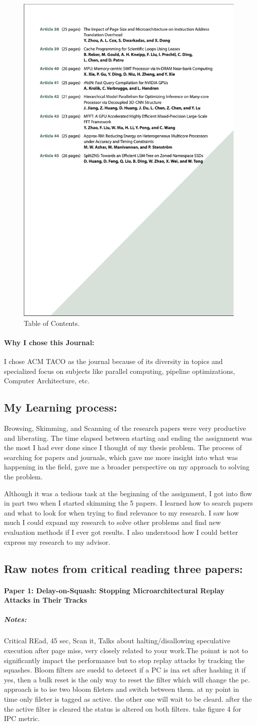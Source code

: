 \documentclass{article}
\begin{document}
\begin{figure}[ht]
    \includegraphics[width=0.25\linewidth]{6.png}
    \caption{Table of Contents. }
    \label{fig:Table of Contents}
\end{figure}
\paragraph{Why I chose this Journal:} I chose ACM TACO as the journal because of its diversity in topics and specialized focus on subjects like parallel computing, pipeline optimizations, Computer Architecture, etc. 
\subsection{My Learning process: }
Browsing, Skimming, and Scanning of the research papers were very productive and liberating. The time elapsed between starting and ending the assignment was the most I had ever done since I thought of my thesis problem. The process of searching for papers and journals, which gave me more insight into what was happening in the field, gave me a broader perspective on my approach to solving the problem. 

Although it was a tedious task at the beginning of the assignment, I got into flow in part two when I started skimming the 5 papers. I learned how to search papers and what to look for when trying to find relevance to my research. I saw how much I could expand my research to solve other problems and find new evaluation methods if I ever got results. I also understood how I could better express my research to my advisor.
\subsection{Raw notes from critical reading three papers: }
\paragraph{Paper 1: Delay-on-Squash: Stopping Microarchitectural Replay Attacks in Their Tracks}
\subparagraph{Notes: }Critical REad, 45 sec, Scan it, Talks about halting/disallowing speculative execution after page miss, very closely related to your work.The poinnt is not to significantly impact the performance but to stop replay attacks by tracking the squashes. Bloom filters are suedd to deteect if a PC is ina set after hashing it if yes, then a bulk reset is the only way to reset the filter which will change the pc. approach is to ise two bloom fileters and switch between them. at ny point in time only fileter is tagged as active. the other one will wait to be cleard. after the the active filter is cleared the status is altered on both filters. take figure 4 for IPC metric.
\end{document}

